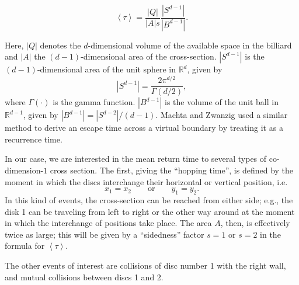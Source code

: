 \documentclass[superscriptaddress,pre,reprint,showpacs,onecolumn]{revtex4-1}
\newcommand{\mean}[1]{\left \langle #1 \right \rangle}
\newcommand{\RR}{\mathbb{R}}
\newcommand{\vv}{\mathbf{v}}
\begin{document}
\begin{equation}\label{meanfreetime}
 \mean{\tau} = \frac{|Q|}{|A|s} \frac{|S^{d-1}|} {|B^{d-1}|}.
\end{equation}


Here, $|Q|$ denotes the $d$-dimensional volume of the available 
space in the billiard and 
$|A|$ the $(d-1)$-dimensional area of the cross-section.
 $|S^{d-1}|$ is the $(d-1)$-dimensional area of the unit sphere in $\RR^d$, given by
\begin{equation}
  |S^{d-1}| = \frac{2 \pi^{d/2}}{\Gamma(d/2)},
\end{equation}
where $\Gamma(\cdot)$ is the gamma function. 
$|B^{d-1}|$ is the volume of the unit ball 
in $\RR^{d-1}$, given by $|B^{d-1}| = |S^{d-2}| / (d-1)$.
Machta and Zwanzig \cite{MachtaZwan} used a similar method to derive an escape 
time across a virtual boundary by treating it as a recurrence time.

In our case, we are interested in the mean return time to 
several types of co-dimension-$1$ cross section.
The first, giving the ``hopping time'', 
is defined by the moment
in which the discs interchange their horizontal or vertical position, i.e.
\begin{equation} \label{condchoque}
x_1 = x_2  \qquad \text{or} \qquad y_1 = y_2.
\end{equation}
In this kind of events, the cross-section can be reached from either side;
e.g., the disk 1 can be traveling from left to right or the other way around
at the moment in which the interchange of positions take place. 
The area $A$, then, 
 is effectively twice as large; this will be given by a ``sidedness'' factor $s = 1$ or $s=2$ in the formula
for $\mean{\tau}$.

The other events of interest are collisions of disc number 1 with the right wall, and mutual
collisions between discs 1 and 2.
%
\end{document}
